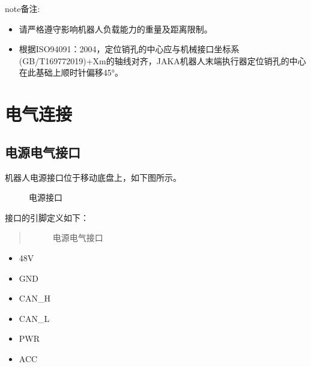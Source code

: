 \documentclass[a4paper,11pt,english,openany,oneside]{sphinxmanual}
\begin{document}
\begin{sphinxadmonition}{note}{备注:}\begin{itemize}
\item {} 
\sphinxAtStartPar
请严格遵守影响机器人负载能力的重量及距离限制。

\item {} 
\sphinxAtStartPar
根据ISO9409\sphinxhyphen{}1：2004，定位销孔的中心应与机械接口坐标系(GB/T16977\sphinxhyphen{}2019)+Xm的轴线对齐，JAKA机器人末端执行器定位销孔的中心在此基础上顺时针偏移45°。

\end{itemize}
\end{sphinxadmonition}


\section{电气连接}
\label{\detokenize{08 _u5b89_u88c5_u4e0e_u8c03_u8bd5:id19}}\label{\detokenize{08 _u5b89_u88c5_u4e0e_u8c03_u8bd5:id20}}

\subsection{电源电气接口}
\label{\detokenize{08 _u5b89_u88c5_u4e0e_u8c03_u8bd5:id21}}\label{\detokenize{08 _u5b89_u88c5_u4e0e_u8c03_u8bd5:id22}}
\sphinxAtStartPar
机器人电源接口位于移动底盘上，如下图所示。

\begin{figure}[H]
\centering
\capstart

\noindent{}
\caption{电源接口}\label{\detokenize{08 _u5b89_u88c5_u4e0e_u8c03_u8bd5:id93}}\end{figure}



\sphinxAtStartPar
接口的引脚定义如下：
\begin{quote}

\begin{figure}[H]
\centering
\capstart

\noindent{}
\caption{电源电气接口}\label{\detokenize{08 _u5b89_u88c5_u4e0e_u8c03_u8bd5:id94}}\end{figure}
\end{quote}
\begin{itemize}
\item {} 
 48V

\item {} 
 GND

\item {} 
 CAN\_H

\item {} 
 CAN\_L

\item {} 
 PWR

\item {} 
 ACC

\end{itemize}
\end{document}
